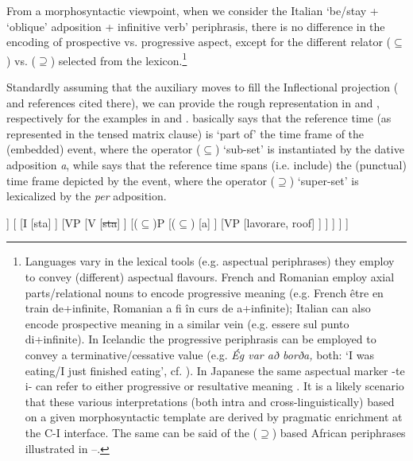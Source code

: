 \documentclass[output=paper,modfonts,nonflat,newtxmath,colorlinks,citecolor=brown]{langsci/langscibook}
\begin{document}
From a morphosyntactic viewpoint, when we consider the Italian ‘be/stay + ‘oblique’ adposition + infinitive verb’ periphrasis, there is no difference in the encoding of prospective {vs}. progressive aspect, except for the different relator  (${\subseteq}$) {vs}. (${\supseteq}$) selected from the lexicon.\footnote{Languages vary in the lexical tools (e.g. aspectual periphrases) they employ to convey (different) aspectual flavours. French and Romanian employ axial parts/relational nouns \citep{Svenonius2006axial} to encode progressive meaning (e.g. French {être en train de}+infinite, Romanian {a fi în curs de a}+infinite); Italian can also encode prospective meaning in a similar vein (e.g. {essere sul punto di+}infinite).  In Icelandic the progressive periphrasis can be employed to convey a terminative/cessative value (e.g. \textit{Ég var að borða,} both: ‘I was eating/I just finished eating’, cf. \citealt{Johannsdottir2011}). In Japanese the same aspectual marker {{}-te i-} can refer to either progressive or resultative meaning \citep{Shirai1998}. It is a likely scenario that these various interpretations (both intra and cross-linguistically) based on a given morphosyntactic template are derived by pragmatic enrichment at the C-I interface. The same can be said of the (\textrm{${\supseteq}$}) based African periphrases illustrated in --.}

Standardly assuming that the auxiliary moves to fill the Inflectional projection (\citealt{ManziniLorussoSavoia2017} and references cited there), we can provide the rough representation in  and , respectively for the examples in and .  basically says that the reference time (as represented in the tensed matrix clause) is ‘part of’ the time frame of the (embedded) event, where the operator (${\subseteq}$) ‘sub-set’  is instantiated by the dative adposition \textit{a}, while  says that the reference time spans (i.e. include) the (punctual) time frame depicted by the event, where the operator (${\supseteq}$) ‘super-set’ is lexicalized by the \textit{per} adposition.%

\ea%
    \label{ex:franco:25}
    \begin{forest}
    	[IP
    		[DP
    			[Gianni]
    		]
    		[
    			[I
    				[sta]
    			]
    			[VP
    				[V
    					[\sout{sta}]
    				]
    				[($\subseteq$)P
    					[($\subseteq$)
    						[a]
    					]
    					[VP
    						[lavorare, roof]
    					]
    				]
    			]
    		]
    	]
    	\end{forest}
    \z
\end{document}
